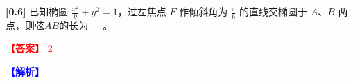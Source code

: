 \documentclass[varwidth=16cm, border=2mm]{standalone}
\begin{document}
\textbf{[0.6]} 已知椭圆 $\frac{x^2}{9} + y^2 = 1$，过左焦点 $F$ 作倾斜角为 $\frac{\pi}{6}$ 的直线交椭圆于 $A$、$B$ 两点，则弦$AB$的长为__。

\vspace{0.2cm}\par\noindent\textcolor{red}{\textbf{【答案】} 2}
\par\noindent\textcolor{blue}{\textbf{【解析】} }
\end{document}
